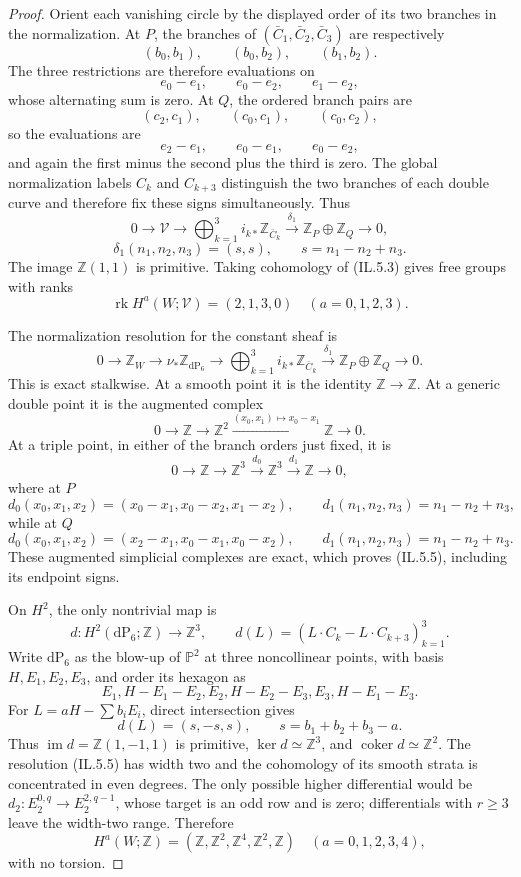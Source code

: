 \begin{proof}
Orient each vanishing circle by the displayed order of its two branches in
the normalization.  At \(P\), the branches of
\((\bar C_1,\bar C_2,\bar C_3)\) are respectively
\[
 (b_0,b_1),\qquad(b_0,b_2),\qquad(b_1,b_2).
\]
The three restrictions are therefore evaluations on
\[
 e_0-e_1,\qquad e_0-e_2,\qquad e_1-e_2,
\]
whose alternating sum is zero.  At \(Q\), the ordered branch pairs are
\[
 (c_2,c_1),\qquad(c_0,c_1),\qquad(c_0,c_2),
\]
so the evaluations are
\[
 e_2-e_1,\qquad e_0-e_1,\qquad e_0-e_2,
\]
and again the first minus the second plus the third is zero.  The global
normalization labels \(C_k\) and \(C_{k+3}\) distinguish the two branches
of each double curve and therefore fix these signs simultaneously.  Thus
\[
0\longrightarrow\mathscr V
\longrightarrow\bigoplus_{k=1}^3 i_{k*}\mathbb Z_{\bar C_k}
\xrightarrow{\delta_1}\mathbb Z_P\oplus\mathbb Z_Q
\longrightarrow0,
\]
\[
 \delta_1(n_1,n_2,n_3)=(s,s),\qquad s=n_1-n_2+n_3.
\tag{IL.5.3}
\]
The image \(\mathbb Z(1,1)\) is primitive.  Taking cohomology of (IL.5.3)
gives free groups with ranks
\[
 \operatorname{rk}H^a(W;\mathscr V)=(2,1,3,0)
 \quad(a=0,1,2,3).
\tag{IL.5.4}
\]

The normalization resolution for the constant sheaf is
\[
0\longrightarrow\mathbb Z_W
\longrightarrow\nu_*\mathbb Z_{\mathrm{dP}_6}
\longrightarrow\bigoplus_{k=1}^3 i_{k*}\mathbb Z_{\bar C_k}
\xrightarrow{\delta_1}\mathbb Z_P\oplus\mathbb Z_Q
\longrightarrow0.
\tag{IL.5.5}
\]
This is exact stalkwise.  At a smooth point it is the identity
\(\mathbb Z\to\mathbb Z\).  At a generic double point it is the augmented
complex
\[
 0\longrightarrow\mathbb Z\longrightarrow\mathbb Z^2
 \xrightarrow{(x_0,x_1)\mapsto x_0-x_1}\mathbb Z\longrightarrow0.
\]
At a triple point, in either of the branch orders just fixed, it is
\[
 0\longrightarrow\mathbb Z\longrightarrow\mathbb Z^3
 \xrightarrow{d_0}\mathbb Z^3
 \xrightarrow{d_1}\mathbb Z\longrightarrow0,
\]
where at \(P\)
\[
 d_0(x_0,x_1,x_2)=(x_0-x_1,x_0-x_2,x_1-x_2),
 \qquad d_1(n_1,n_2,n_3)=n_1-n_2+n_3,
\]
while at \(Q\)
\[
 d_0(x_0,x_1,x_2)=(x_2-x_1,x_0-x_1,x_0-x_2),
 \qquad d_1(n_1,n_2,n_3)=n_1-n_2+n_3.
\]
These augmented simplicial complexes are exact, which proves (IL.5.5),
including its endpoint signs.

On \(H^2\), the only nontrivial map is
\[
 d:H^2(\mathrm{dP}_6;\mathbb Z)\longrightarrow\mathbb Z^3,
 \qquad
 d(L)=(L\cdot C_k-L\cdot C_{k+3})_{k=1}^3.
\]
Write \(\mathrm{dP}_6\) as the blow-up of \(\mathbb P^2\) at three
noncollinear points, with basis \(H,E_1,E_2,E_3\), and order its hexagon as
\[
 E_1, H-E_1-E_2, E_2, H-E_2-E_3, E_3, H-E_1-E_3.
\]
For \(L=aH-\sum b_iE_i\), direct intersection gives
\[
 d(L)=(s,-s,s),\qquad s=b_1+b_2+b_3-a.
\tag{IL.5.6}
\]
Thus \(\operatorname{im}d=\mathbb Z(1,-1,1)\) is primitive,
\(\ker d\simeq\mathbb Z^3\), and
\(\operatorname{coker}d\simeq\mathbb Z^2\).  The resolution (IL.5.5) has
width two and the cohomology of its smooth strata is concentrated in even
degrees.  The only possible higher differential would be
\(d_2:E_2^{0,q}\to E_2^{2,q-1}\), whose target is an odd row and is zero;
differentials with \(r\ge3\) leave the width-two range.  Therefore
\[
 H^a(W;\mathbb Z)=
 (\mathbb Z,\mathbb Z^2,\mathbb Z^4,\mathbb Z^2,\mathbb Z)
 \quad(a=0,1,2,3,4),
\tag{IL.5.7}
\]
with no torsion.


\end{proof}
